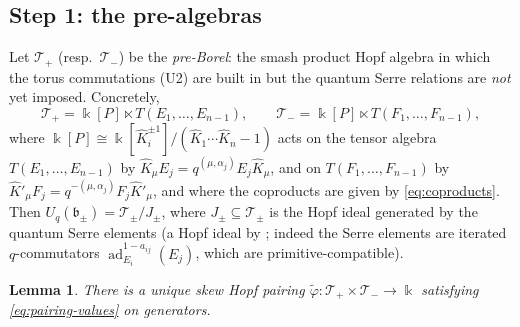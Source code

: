 \documentclass[11pt]{amsart}
\newtheorem{lemma}[theorem]{Lemma}
\theoremstyle{definition}
\newcommand{\BK}{\Bbbk}
\newcommand{\fb}{\mathfrak{b}}
\newcommand{\hK}{\hat K}
\newcommand{\al}{\alpha}
\begin{document}
\subsection{Step 1: the pre-algebras}
Let $\mathcal{T}_+$ (resp.\ $\mathcal{T}_-$) be the \emph{pre-Borel}: the smash
product Hopf algebra in which the torus commutations (U2) are built in but the
quantum Serre relations are \emph{not} yet imposed. Concretely,
\[
\mathcal{T}_+=\BK[P]\ltimes T(E_1,\dots,E_{n-1}),\qquad
\mathcal{T}_-=\BK[P]\ltimes T(F_1,\dots,F_{n-1}),
\]
where $\BK[P]\cong\BK[\hK_i^{\pm1}]/(\hK_1\cdots\hK_n-1)$ acts on the tensor
algebra $T(E_1,\dots,E_{n-1})$ by
$\hK_\mu E_j=q^{(\mu,\al_j)}E_j\hK_\mu$, and on
$T(F_1,\dots,F_{n-1})$ by $\hK'_\mu F_j=q^{-(\mu,\al_j)}F_j\hK'_\mu$, and where
the coproducts are given by \eqref{eq:coproducts}. Then
$U_q(\fb_\pm)=\mathcal{T}_\pm/J_\pm$, where $J_\pm\subseteq\mathcal{T}_\pm$ is
the Hopf ideal generated by the quantum Serre elements (a Hopf ideal by
\cite{Jan,Lus}; indeed the Serre elements are iterated $q$-commutators
$\operatorname{ad}_{E_i}^{1-a_{ij}}(E_j)$, which are primitive-compatible).

\begin{lemma}\label{lem:extension}
There is a unique skew Hopf pairing
$\widetilde\varphi:\mathcal{T}_+\times\mathcal{T}_-\to\BK$ satisfying
\eqref{eq:pairing-values} on generators.
\end{lemma}
\end{document}
